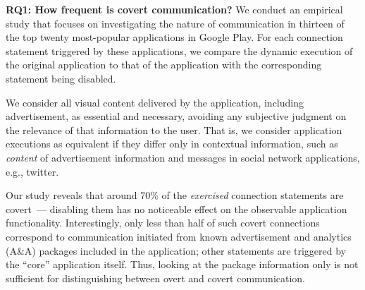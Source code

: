 \noindent 
{\bf RQ1: How frequent is covert communication?} %
We conduct an empirical study that focuses on %
investigating the nature of communication in thirteen of the 
top twenty most-popular applications in Google Play.  
For each connection statement triggered by these applications, we compare the dynamic execution of the original application to that of the application with the corresponding statement being disabled. 

We consider all visual content delivered by the application, including advertisement, as essential and necessary, avoiding any subjective judgment on the relevance of that information to the user.  
That is, we consider application executions as
equivalent if they %
differ only in contextual information, such as   
\emph{content} of advertisement information and messages in social network
applications, e.g., twitter.

Our study reveals that around 70\% of
the \emph{exercised} connection statements are covert~--- disabling
them has no noticeable effect on the observable application
functionality. Interestingly, only less than half of such covert connections correspond to communication initiated from known advertisement and analytics (A\&A) packages included in the application; other statements are triggered by the ``core'' application itself. 
Thus, looking at the package information only is not sufficient for distinguishing between
overt and covert communication. 

